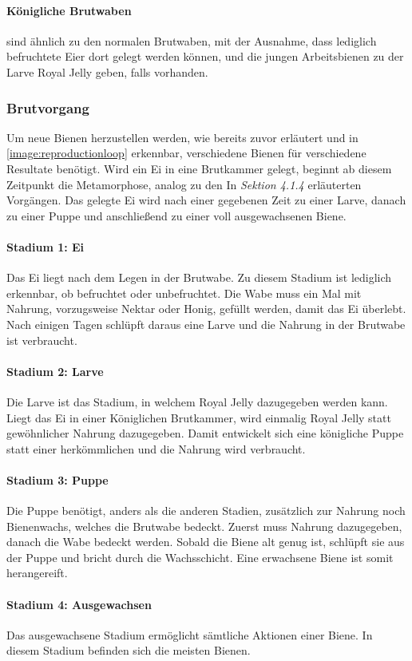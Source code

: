 \paragraph{Königliche Brutwaben} sind ähnlich zu den normalen Brutwaben, mit der Ausnahme, dass lediglich befruchtete Eier dort gelegt werden können, und die jungen Arbeitsbienen zu der Larve Royal Jelly geben, falls vorhanden.

\subsubsection{Brutvorgang}
Um neue Bienen herzustellen werden, wie bereits zuvor erläutert und in \autoref{image:reproductionloop} erkennbar, verschiedene Bienen für verschiedene Resultate benötigt. Wird ein Ei in eine Brutkammer gelegt, beginnt ab diesem Zeitpunkt die Metamorphose, analog zu den In \textit{Sektion 4.1.4} erläuterten Vorgängen. Das gelegte Ei wird nach einer gegebenen Zeit zu einer Larve, danach zu einer Puppe und anschließend zu einer voll ausgewachsenen Biene.

\paragraph{Stadium 1: Ei} Das Ei liegt nach dem Legen in der Brutwabe. Zu diesem Stadium ist lediglich erkennbar, ob befruchtet oder unbefruchtet. Die Wabe muss ein Mal mit Nahrung, vorzugsweise Nektar oder Honig, gefüllt werden, damit das Ei überlebt. Nach einigen Tagen schlüpft daraus eine Larve und die Nahrung in der Brutwabe ist verbraucht.

\paragraph{Stadium 2: Larve} Die Larve ist das Stadium, in welchem Royal Jelly dazugegeben werden kann. Liegt das Ei in einer Königlichen Brutkammer, wird einmalig Royal Jelly statt gewöhnlicher Nahrung dazugegeben. Damit entwickelt sich eine königliche Puppe statt einer herkömmlichen und die Nahrung wird verbraucht.

\paragraph{Stadium 3: Puppe} Die Puppe benötigt, anders als die anderen Stadien, zusätzlich zur Nahrung noch Bienenwachs, welches die Brutwabe bedeckt. Zuerst muss Nahrung dazugegeben, danach die Wabe bedeckt werden. Sobald die Biene alt genug ist, schlüpft sie aus der Puppe und bricht durch die Wachsschicht. Eine erwachsene Biene ist somit herangereift.

\paragraph{Stadium 4: Ausgewachsen} Das ausgewachsene Stadium ermöglicht sämtliche Aktionen einer Biene. In diesem Stadium befinden sich die meisten Bienen. 